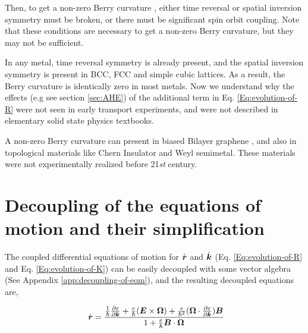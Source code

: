\documentclass{report}
\renewcommand\vec[1]{\ensuremath\boldsymbol{#1}} %
\begin{document}
Then, to get a non-zero Berry curvature \cite{ralph2020berry}, either time reversal or spatial inversion symmetry must be broken, or there must be significant spin orbit coupling. Note that these conditions are necessary to get a non-zero Berry curvature, but they may not be sufficient.

In any metal, time reversal symmetry is already present, and the spatial inversion symmetry is present in BCC, FCC and simple cubic lattices. As a result, the Berry curvature is identically zero in most metals. Now we understand why the effects (e.g see section \ref{sec:AHE}) of the additional term in Eq. \eqref{Eq:evolution-of-R} were not seen in early transport experiments, and were not described in elementary solid state physics textbooks.
 
A non-zero Berry curvature can present in biased Bilayer graphene \cite{PhysRevB.79.245424, PhysRevLett.99.236809}, and also in topological materials like Chern Insulator and Weyl semimetal. These materials were not experimentally realized before 21\textit{st} century.
 
\section{Decoupling of the equations of motion and their simplification}

The coupled differential equations of motion for $\dot{\vec{r}}$ and $\dot{\vec{k}}$ (Eq. \eqref{Eq:evolution-of-R} and Eq. \eqref{Eq:evolution-of-K}) can be easily decoupled with some vector algebra (See Appendix \ref{app:decoupling-of-eom}), and the resulting decoupled equations are,

\begin{equation}~\label{Eq:SC_EOM_r_dot}
	\dot{\vec{r}} = \frac{\frac{1}{\hbar} \frac{\partial \varepsilon}{\partial \vec{k}} + \frac{e}{\hbar} (\vec{E}\times\vec{\Omega}) + \frac{e}{\hbar^2} (\vec{\Omega} \cdot \frac{\partial \varepsilon}{\partial \vec{k}} )\vec{B}}{1 + \frac{e}{\hbar} \vec{B}\cdot\vec{\Omega}}
\end{equation}
\end{document}
